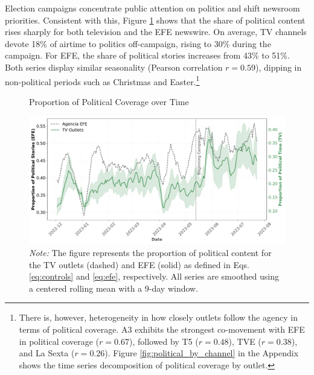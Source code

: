\documentclass[12pt]{article}
\begin{document}
		
	
	
Election campaigns concentrate public attention on politics and shift newsroom priorities. Consistent with this, Figure \ref{fig:coverage} shows that the share of political content rises sharply for both television and the EFE newswire. On average, TV channels devote 18\% of airtime to politics off-campaign, rising to 30\% during the campaign. For EFE, the share of political stories increases from 43\% to 51\%. Both series display similar seasonality (Pearson correlation  $r=0.59$), dipping in non-political periods such as Christmas and Easter.\footnote{	There is, however, heterogeneity in how closely outlets follow the agency in terms of political coverage. A3 exhibits the strongest co-movement with EFE in political coverage ($r=0.67$), followed by T5 ($r=0.48$), TVE ($r=0.38$), and La Sexta ($r=0.26$). Figure \ref{fig:political_by_channel} in the Appendix shows the time series decomposition of political coverage by outlet.}
	

	
	
		
	\begin{figure}[!htb]
		\caption{Proportion of Political Coverage over Time}
		\centering
				\includegraphics[width=150mm]{figures/political_words_both}
		\caption*{\small \textit{Note:} The figure represents the proportion of political content for the TV outlets (dashed) and  EFE (solid) as defined in Eqs. \eqref{eq:controls} and \eqref{eq:efe}, respectively. All series are smoothed using a centered rolling mean with a 9-day window.}
		\label{fig:coverage}
	\end{figure}
	

	
	

	

 
\end{document}
